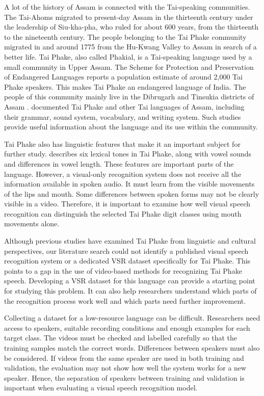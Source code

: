 \documentclass[journal]{IEEEtran}
\begin{document}
A lot of the history of Assam is connected with the Tai-speaking communities. The Tai-Ahoms migrated to present-day Assam in the thirteenth century under the leadership of Siu-kha-pha, who ruled for about 600 years, from the thirteenth to the nineteenth century. The people belonging to the Tai Phake community migrated in and around 1775 from the Hu-Kwang Valley to Assam in search of a better life\cite{lahkar2019origin}. Tai Phake, also called Phakial, is a Tai-speaking language used by a small community in Upper Assam. The Scheme for Protection and Preservation of Endangered Languages reports a population estimate of around 2,000 Tai Phake speakers\cite{deka2025studying}. This makes Tai Phake an endangered language of India. The people of this community mainly live in the Dibrugarh and Tinsukia districts of Assam \cite{sppeletaiphake}. \cite{morey2005tailanguages} documented Tai Phake and other Tai languages of Assam, including their grammar, sound system, vocabulary, and writing system. Such studies provide useful information about the language and its use within the community.

Tai Phake also has linguistic features that make it an important subject for further study. \cite{morey2020syllable} describes six lexical tones in Tai Phake, along with vowel sounds and differences in vowel length. These features are important parts of the language. However, a visual-only recognition system does not receive all the information available in spoken audio. It must learn from the visible movements of the lips and mouth. Some differences between spoken forms may not be clearly visible in a video. Therefore, it is important to examine how well visual speech recognition can distinguish the selected Tai Phake digit classes using mouth movements alone.

Although previous studies have examined Tai Phake from linguistic and cultural perspectives, our literature search could not identify a published visual speech recognition system or a dedicated VSR dataset specifically for Tai Phake. This points to a gap in the use of video-based methods for recognizing Tai Phake speech. Developing a VSR dataset for this language can provide a starting point for studying this problem. It can also help researchers understand which parts of the recognition process work well and which parts need further improvement.

Collecting a dataset for a low-resource language can be difficult. Researchers need access to speakers, suitable recording conditions and enough examples for each target class. The videos must be checked and labelled carefully so that the training samples match the correct words. Differences between speakers must also be considered. If videos from the same speaker are used in both training and validation, the evaluation may not show how well the system works for a new speaker. Hence, the separation of speakers between training and validation is important when evaluating a visual speech recognition model.
\end{document}
